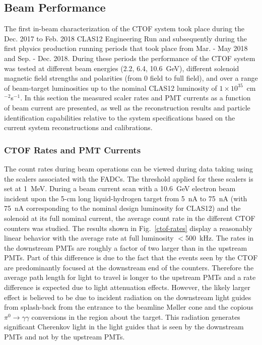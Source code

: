 \documentclass[3p,times,twocolumn]{elsarticle}
\begin{document}
\subsection{Beam Performance}  
\label{sec:beam}

The first in-beam characterization of the CTOF system took place during the Dec. 2017 to Feb. 2018
CLAS12 Engineering Run and subsequently during the first physics production running periods that
took place from Mar. - May 2018 and Sep. - Dec. 2018. During these periods the performance of the
CTOF system was tested at different beam energies (2.2, 6.4, 10.6~GeV), different solenoid magnetic
field strengths and polarities (from 0 field to full field), and over a range of beam-target luminosities
up to the nominal CLAS12 luminosity of $1 \times 10^{35}$~cm$^{-2}$s$^{-1}$. In this section the measured
scaler rates and PMT currents as a function of beam current are presented, as well as the reconstruction
results and particle identification capabilities relative to the system specifications based on the current
system reconstructions and calibrations.

\subsubsection{CTOF Rates and PMT Currents}

The count rates during beam operations can be viewed during data taking using the scalers associated
with the FADCs. The threshold applied for these scalers is set at 1~MeV. During a beam current scan
with a 10.6~GeV electron beam incident upon the 5-cm long liquid-hydrogen target from 5~nA to 75~nA
(with 75~nA corresponding to the nominal design luminosity for CLAS12) and the solenoid at its full nominal
current, the average count rate in the different CTOF counters was studied. The results shown in
Fig.~\ref{ctof-rates} display a reasonably linear behavior with the average rate at full luminosity
$<$500~kHz. The rates in the downstream PMTs are roughly a factor of two larger than in the upstream
PMTs. Part of this difference is due to the fact that the events seen by the CTOF are predominantly
focused at the downstream end of the counters. Therefore the average path length for light to travel is
longer to the upstream PMTs and a rate difference is expected due to light attenuation effects. However,
the likely larger effect is believed to be due to incident radiation on the downstream light guides from
splash-back from the entrance to the beamline M{\o}ller cone and the copious $\pi^0 \to \gamma \gamma$
conversions in the region about the target. This radiation generates significant Cherenkov light in the light
guides that is seen by the downstream PMTs and not by the upstream PMTs.
\end{document}
